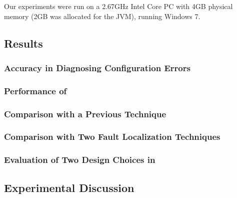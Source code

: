 
Our experiments were run on a
2.67GHz Intel Core PC with 4GB physical memory (2GB was allocated
for the JVM), running Windows 7.


\vspace{-1mm}
\subsection{Results}
\label{sec:results}


\subsubsection{Accuracy in Diagnosing Configuration Errors}
\label{sec:accuracy}


\subsubsection{Performance of \ourtool}
\label{sec:performance}


\subsubsection{Comparison with a Previous Technique}
\label{sec:confanalyzer}



\subsubsection{Comparison with Two Fault Localization Techniques}
\label{sec:comparison}




\subsubsection{Evaluation of Two Design Choices in \ourtool}
\label{sec:choices}



\vspace{-1mm}
\subsection{Experimental Discussion}
\vspace{-1mm}


